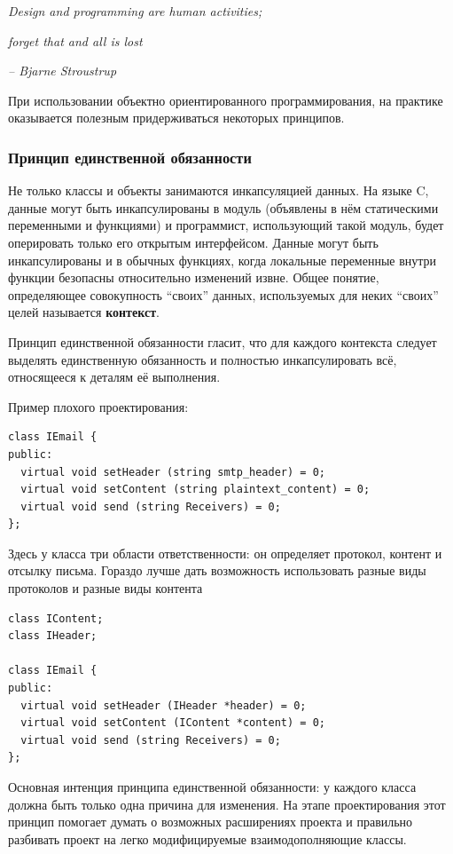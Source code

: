 \documentclass[a4paper,12pt,oneside]{article}
\begin{document}
\hfill\textit{Design and programming are human activities;}

\hfill\textit{forget that and all is lost}{\vspace{0.5em}}

\hfill\textit{-- Bjarne Stroustrup}

При использовании объектно ориентированного программирования, на практике оказывается полезным придерживаться некоторых принципов.

\subsubsection{Принцип единственной обязанности}\label{SRP}

Не только классы и объекты занимаются инкапсуляцией данных. На языке C, данные могут быть инкапсулированы в модуль (объявлены в нём статическими переменными и функциями) и программист, использующий такой модуль, будет оперировать только его открытым интерфейсом. Данные могут быть инкапсулированы и в обычных функциях, когда локальные переменные внутри функции безопасны относительно изменений извне. Общее понятие, определяющее совокупность ``своих'' данных, используемых для неких ``своих'' целей называется \textbf{контекст}.

Принцип единственной обязанности гласит, что для каждого контекста следует выделять единственную обязанность и полностью инкапсулировать всё, относящееся к деталям её выполнения.

Пример плохого проектирования:

\begin{lstlisting}
class IEmail {
public:
  virtual void setHeader (string smtp_header) = 0;
  virtual void setContent (string plaintext_content) = 0;
  virtual void send (string Receivers) = 0;
};
\end{lstlisting}

Здесь у класса три области ответственности: он определяет протокол, контент и отсылку письма. Гораздо лучше дать возможность использовать разные виды протоколов и разные виды контента

\begin{lstlisting}
class IContent;
class IHeader;

class IEmail {
public:
  virtual void setHeader (IHeader *header) = 0;
  virtual void setContent (IContent *content) = 0;
  virtual void send (string Receivers) = 0;
};
\end{lstlisting}

Основная интенция принципа единственной обязанности: у каждого класса должна быть только одна причина для изменения. На этапе проектирования этот принцип помогает думать о возможных расширениях проекта и правильно разбивать проект на легко модифицируемые взаимодополняющие классы.
\end{document}
